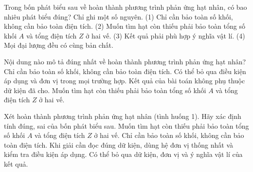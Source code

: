 \begin{ex}
Trong bốn phát biểu sau về hoàn thành phương trình phản ứng hạt nhân, có bao nhiêu phát biểu đúng? Chỉ ghi một số nguyên. (1) Chỉ cần bảo toàn số khối, không cần bảo toàn điện tích. (2) Muốn tìm hạt còn thiếu phải bảo toàn tổng số khối $A$ và tổng điện tích $Z$ ở hai vế. (3) Kết quả phải phù hợp ý nghĩa vật lí. (4) Mọi đại lượng đều có cùng bản chất.
\end{ex}

\begin{ex}
Nội dung nào mô tả đúng nhất về hoàn thành phương trình phản ứng hạt nhân?
\choice
{Chỉ cần bảo toàn số khối, không cần bảo toàn điện tích.}
{Có thể bỏ qua điều kiện áp dụng và đơn vị trong mọi trường hợp.}
{Kết quả của bài toán không phụ thuộc dữ kiện đã cho.}
{\True Muốn tìm hạt còn thiếu phải bảo toàn tổng số khối $A$ và tổng điện tích $Z$ ở hai vế.}
\end{ex}

\begin{ex}
Xét hoàn thành phương trình phản ứng hạt nhân (tình huống 1). Hãy xác định tính đúng, sai của bốn phát biểu sau.
\choiceTF
{\True Muốn tìm hạt còn thiếu phải bảo toàn tổng số khối $A$ và tổng điện tích $Z$ ở hai vế.}
{Chỉ cần bảo toàn số khối, không cần bảo toàn điện tích.}
{\True Khi giải cần đọc đúng dữ kiện, dùng hệ đơn vị thống nhất và kiểm tra điều kiện áp dụng.}
{Có thể bỏ qua dữ kiện, đơn vị và ý nghĩa vật lí của kết quả.}
\end{ex}

